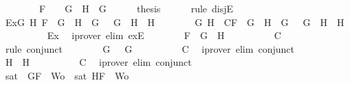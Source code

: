 \begin{isabellebody}
\ \ \ \ \ \ \ \ F\ {\isacharequal}\ \isactrlbold {\isasymnot}\ {\isacharparenleft}\isactrlbold {\isasymnot}\ G{\isacharparenright}\ {\isasymand}\ H\ {\isacharequal}\ G{\isachardoublequoteclose}\isanewline
\ \ \ \ \isamarkupfalse%
\ {\isacharquery}thesis\isanewline
\ \ \ \ \isamarkupfalse%
\ {\isacharparenleft}rule\ disjE{\isacharparenright}\isanewline
\ \ \ \ \ \ \isamarkupfalse%
\ Ex{}{\isacharcolon}{\isachardoublequoteopen}{\isasymexists}G{}\ H{}{\isachardot}\ F\ {\isacharequal}\ G{}\ \isactrlbold {\isasymrightarrow}\ H{}\ {\isasymand}\ G\ {\isacharequal}\ \isactrlbold {\isasymnot}\ G{}\ {\isasymand}\ H\ {\isacharequal}\ H{}{\isachardoublequoteclose}\isanewline
\ \ \ \ \ \ \isamarkupfalse%
\ G{}\ H{}\ \ C{}{\isacharcolon}{\isachardoublequoteopen}F\ {\isacharequal}\ G{}\ \isactrlbold {\isasymrightarrow}\ H{}\ {\isasymand}\ G\ {\isacharequal}\ \isactrlbold {\isasymnot}\ G{}\ {\isasymand}\ H\ {\isacharequal}\ H{}{\isachardoublequoteclose}\isanewline
\ \ \ \ \ \ \ \ \isamarkupfalse%
\ Ex{}\ \isamarkupfalse%
\ {\isacharparenleft}iprover\ elim{\isacharcolon}\ exE{\isacharparenright}\isanewline
\ \ \ \ \ \ \isamarkupfalse%
\ {\isachardoublequoteopen}F\ {\isacharequal}\ G{}\ \isactrlbold {\isasymrightarrow}\ H{}{\isachardoublequoteclose}\isanewline
\ \ \ \ \ \ \ \ \isamarkupfalse%
\ C{}\ \isamarkupfalse%
\ {\isacharparenleft}rule\ conjunct{}{\isacharparenright}\isanewline
\ \ \ \ \ \ \isamarkupfalse%
\ {\isachardoublequoteopen}G\ {\isacharequal}\ \isactrlbold {\isasymnot}\ G{}{\isachardoublequoteclose}\isanewline
\ \ \ \ \ \ \ \ \isamarkupfalse%
\ C{}\ \isamarkupfalse%
\ {\isacharparenleft}iprover\ elim{\isacharcolon}\ conjunct{}{\isacharparenright}\isanewline
\ \ \ \ \ \ \isamarkupfalse%
\ {\isachardoublequoteopen}H\ {\isacharequal}\ H{}{\isachardoublequoteclose}\isanewline
\ \ \ \ \ \ \ \ \isamarkupfalse%
\ C{}\ \isamarkupfalse%
\ {\isacharparenleft}iprover\ elim{\isacharcolon}\ conjunct{}{\isacharparenright}\isanewline
\ \ \ \ \ \ \isamarkupfalse%
\ {\isachardoublequoteopen}sat\ {\isacharparenleft}{\isacharbraceleft}\isactrlbold {\isasymnot}\ G{}{\isacharcomma}F{\isacharbraceright}\ {\isasymunion}\ Wo{\isacharparenright}\ {\isasymor}\ sat\ {\isacharparenleft}{\isacharbraceleft}H{}{\isacharcomma}F{\isacharbraceright}\ {\isasymunion}\ Wo{\isacharparenright}{\isachardoublequoteclose}\isanewline

\end{isabellebody}
